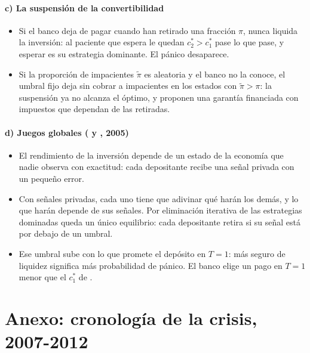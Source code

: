 \documentclass[11pt]{article}
\begin{document}
\paragraph{c) La suspensión de la convertibilidad}

\begin{itemize}
\item Si el banco deja de pagar cuando han retirado una fracción $\pi$, nunca liquida la inversión: al paciente que espera le quedan $c_2^*>c_1^*$ pase lo que pase, y esperar es su estrategia dominante. El pánico desaparece.
\item Si la proporción de impacientes $\tilde\pi$ es aleatoria y el banco no la conoce, el umbral fijo deja sin cobrar a impacientes en los estados con $\tilde\pi>\pi$: la suspensión ya no alcanza el óptimo, y \textcite{DiamondDybvig1983Bank} proponen una garantía financiada con impuestos que dependan de las retiradas.
\end{itemize}

\paragraph{d) Juegos globales ( y , 2005)}

\begin{itemize}
\item El rendimiento de la inversión depende de un estado de la economía que nadie observa con exactitud: cada depositante recibe una señal privada con un pequeño error.
\item Con señales privadas, cada uno tiene que adivinar qué harán los demás, y lo que harán depende de sus señales. Por eliminación iterativa de las estrategias dominadas queda un único equilibrio: cada depositante retira si su señal está por debajo de un umbral\nocite{GoldsteinPauzner2005}.
\item Ese umbral sube con lo que promete el depósito en $T=1$: más seguro de liquidez significa más probabilidad de pánico. El banco elige un pago en $T=1$ menor que el $c_1^*$ de \textcite{DiamondDybvig1983Bank}.
\end{itemize}

\section{Anexo: cronología de la crisis, 2007-2012}\label{anexo:cronologia}
\end{document}

